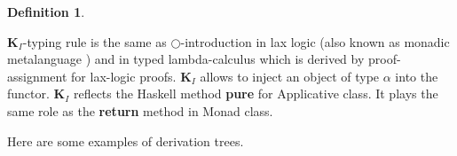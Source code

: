 \documentclass[a4paper]{article}
\newtheorem{defin}{Definition}
\begin{document}
\begin{defin}
\begin{minipage}{0.5\textwidth}
\begin{flushright}
  \begin{prooftree}
  \end{prooftree}

  \begin{prooftree}
  \end{prooftree}
    \end{flushright}
  \end{minipage}
  \end{defin}

  $\textbf{K}_I$-typing rule is the same as $\bigcirc$-introduction in lax logic (also known as monadic
  metalanguage \cite{Lax}) and in typed lambda-calculus which is derived by proof-assignment for lax-logic
  proofs.
  $\textbf{K}_I$ allows to inject an object of type $\alpha$ into the functor. $\textbf{K}_I$  reflects the
  Haskell method {\bf pure} for Applicative class. It plays the same role as the {\bf return} method in Monad class.



  \vspace{\baselineskip}

Here are some examples of derivation trees.

  \begin{prooftree}
  \end{prooftree}


  \begin{prooftree}
  \end{prooftree}
\end{document}
